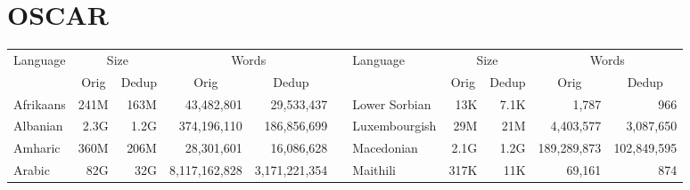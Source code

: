 \section{OSCAR}

\begin{table*}[t!]
    \centering\tiny
    \begin{tabular}{lrrrrclrrrr}\toprule
        \multirow{2}{*}{Language} & \multicolumn{2}{c}{Size} & \multicolumn{2}{c}{Words} & \phantom{a}              & \multirow{2}{*}{Language} & \multicolumn{2}{c}{Size} & \multicolumn{2}{c}{Words}                                                                                                               \\
        \cmidrule(l{2pt}r{2pt}){2-3} \cmidrule(l{2pt}r{2pt}){4-5} \cmidrule(l{2pt}r{2pt}){8-9} \cmidrule(l{2pt}r{2pt}){10-11}
                                  & \multicolumn{1}{c}{Orig} & \multicolumn{1}{c}{Dedup} & \multicolumn{1}{c}{Orig} & \multicolumn{1}{c}{Dedup} & \phantom{a}              &                           & \multicolumn{1}{c}{Orig} & \multicolumn{1}{c}{Dedup} & \multicolumn{1}{c}{Orig} & \multicolumn{1}{c}{Dedup} \\\midrule
        Afrikaans                 & 241M                     & 163M                      & 43,482,801               & 29,533,437                &                          & Lower Sorbian             & 13K                      & 7.1K                      & 1,787                    & 966                       \\
        Albanian                  & 2.3G                     & 1.2G                      & 374,196,110              & 186,856,699               &                          & Luxembourgish             & 29M                      & 21M                       & 4,403,577                & 3,087,650                 \\
        Amharic                   & 360M                     & 206M                      & 28,301,601               & 16,086,628                &                          & Macedonian                & 2.1G                     & 1.2G                      & 189,289,873              & 102,849,595               \\
        Arabic                    & 82G                      & 32G                       & 8,117,162,828            & 3,171,221,354             &                          & Maithili                  & 317K                     & 11K                       & 69,161                   & 874                       \\

\end{tabular}
\end{table*}
